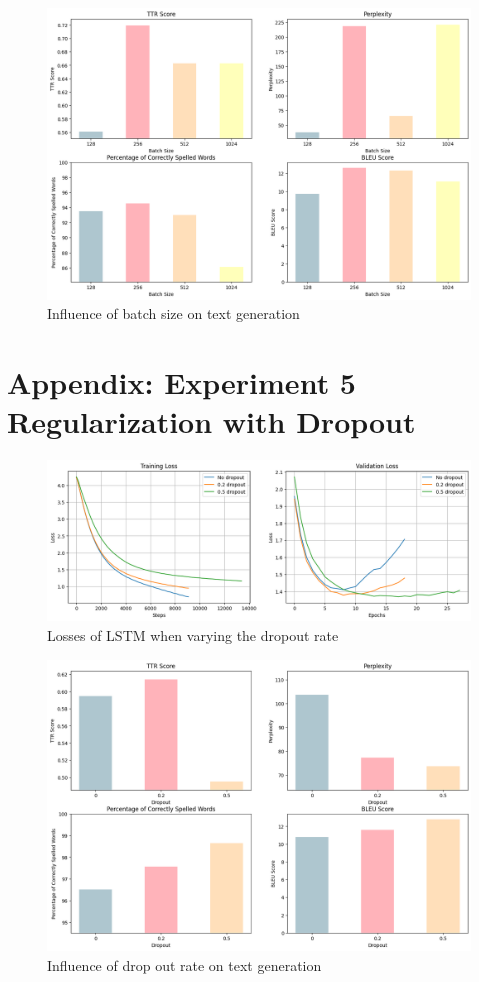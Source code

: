 \documentclass{article}
\begin{document}
\begin{figure}[H]
    \centering
    \includegraphics[width=0.8\linewidth]{figures/text_batch_size.png}
    \caption{Influence of batch size on text generation}
    \label{fig:text_batch}
\end{figure}


\section*{Appendix: Experiment 5 Regularization with Dropout}
\begin{figure}[H]
    \centering
    \includegraphics[width=\linewidth]{figures/LSTM_dropout.png}
    \caption{Losses of LSTM when varying the dropout rate}
    \label{fig:loss_dropout}
\end{figure}

\begin{figure}[H]
    \centering
    \includegraphics[width=0.8\linewidth]{figures/text_dropout.png}
    \caption{Influence of drop out rate on text generation}
    \label{fig:text_dropout}
\end{figure}
\end{document}
